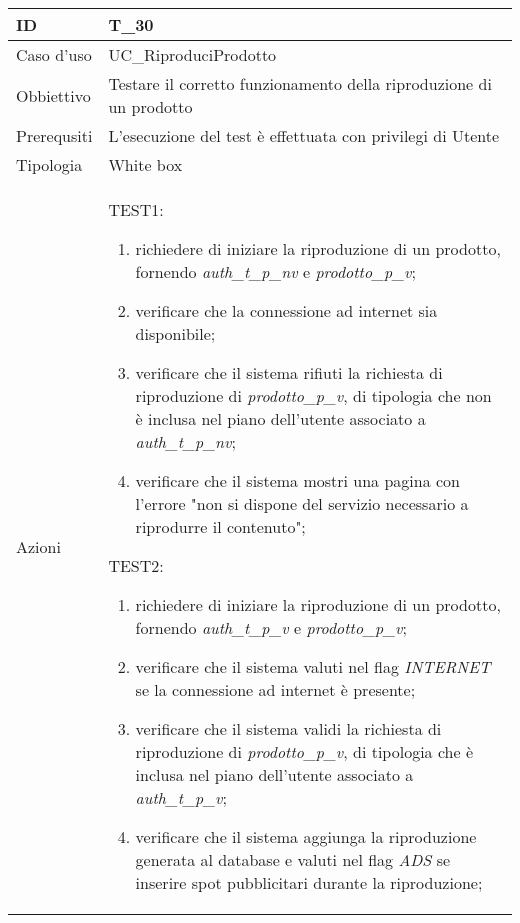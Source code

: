 \begin{table}[hb]
    \centering
    \begin{tabular}{ |p{2cm}|p{10cm}|  }
        \hline
        ID          & T\_30                                                               \\\hline
        Caso d'uso  & UC\_RiproduciProdotto                                               \\\hline
        Obbiettivo  & Testare il corretto funzionamento della riproduzione di un prodotto \\\hline
        Prerequsiti & L'esecuzione del test è effettuata con privilegi di Utente          \\\hline
        Tipologia   & White box                                                           \\\hline
        Azioni      &
        TEST1:
        \begin{enumerate}[nosep, topsep=0pt]
            \item richiedere di iniziare la riproduzione di un prodotto, fornendo \emph{auth\_t\_p\_nv} e \emph{prodotto\_p\_v};
            \item verificare che la connessione ad internet sia disponibile;
            \item verificare che il sistema rifiuti la richiesta di riproduzione di \emph{prodotto\_p\_v}, di tipologia che non è inclusa nel piano dell'utente associato a \emph{auth\_t\_p\_nv};
            \item verificare che il sistema mostri una pagina con l'errore "non si dispone del servizio necessario a riprodurre il contenuto";
        \end{enumerate}
        \vspace{0.5cm} TEST2:
        \begin{enumerate}[nosep, topsep=0pt]
            \item richiedere di iniziare la riproduzione di un prodotto, fornendo \emph{auth\_t\_p\_v} e \emph{prodotto\_p\_v};
            \item verificare che il sistema valuti nel flag \emph{INTERNET} se la connessione ad internet è presente;
            \item verificare che il sistema validi la richiesta di riproduzione di \emph{prodotto\_p\_v}, di tipologia che è inclusa nel piano dell'utente associato a \emph{auth\_t\_p\_v};
            \item verificare che il sistema aggiunga la riproduzione generata al database e valuti nel flag \emph{ADS} se inserire spot pubblicitari durante la riproduzione;

\end{enumerate}
\end{tabular}
\end{table}
